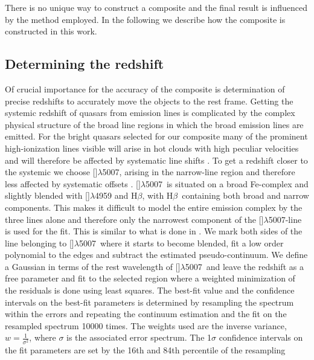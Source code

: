 \documentclass{aa}    %
\newcommand{\sectlabel}[1]{\label{sect:#1}}
\newcommand{\hb}{H$\beta$}
\newcommand{\oiii}{[\ion{O}{iii}]$\lambda$5007}
\begin{document}
There is no unique way to construct a composite and the final result is
influenced by the method employed. In the following we describe how the
composite is constructed in this work.

\subsection{Determining the redshift}  \sectlabel{redshifts}

Of crucial importance for the accuracy of the composite is
determination of precise redshifts to accurately move the objects to
the rest frame. Getting the systemic redshift of quasars from emission
lines is complicated by the complex physical structure of the broad
line regions in which the broad emission lines are emitted. For the
bright quasars selected for our composite many of the prominent
high-ionization lines visible will arise in hot clouds with high
peculiar velocities and will therefore be affected by systematic
line shifts \citep{Tytler1992, Richards2002b, Gaskell2013}. To get a
redshift closer to the systemic we choose \oiii, arising in the
narrow-line region and therefore less affected by systematic offsets
\citep{Hewett2010}. \oiii~is situated on a broad Fe-complex and
slightly blended with []$\lambda$4959 and \hb, with \hb~containing both broad and narrow components.  
This makes it difficult to
model the entire emission complex by the three lines alone and
therefore only the narrowest component of the \oiii-line is used for
the fit. This is similar to what is done in \citet{VandenBerk2001}.
We mark both sides of the line belonging to
\oiii~where it starts to become blended, fit a low order polynomial
to the edges and subtract the estimated pseudo-continuum.
We define a Gaussian in terms of the rest wavelength of \oiii~and
leave the redshift as a free parameter and fit to the selected
region where a weighted minimization of the residuals is done using
least squares. The best-fit value and the confidence intervals on the
best-fit parameters is determined by resampling the spectrum within
the errors and repeating the continuum estimation and the fit on the
resampled spectrum 10000 times. The weights used are the inverse
variance, $ w = \frac{1}{\sigma^2}$, where $\sigma$ is the associated
error spectrum. The 1$\sigma$ confidence intervals on the fit
parameters are set by the 16th and 84th percentile of the resampling
\end{document}
